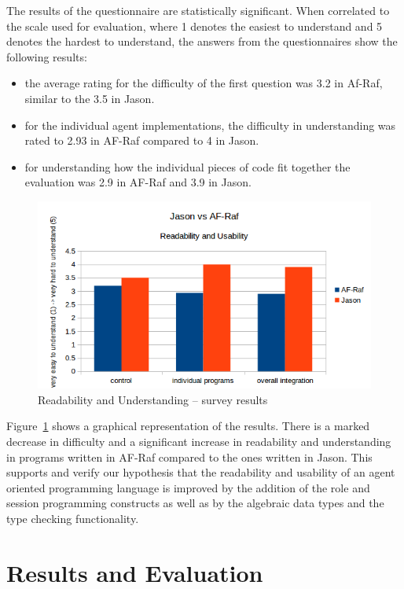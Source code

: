 \documentclass[a4paper,12pt,oneside,fleqn]{book} %
\begin{document}
{The results of the questionnaire are statistically significant. When
correlated to the scale used for evaluation, where 1 denotes the easiest to
understand and 5 denotes the hardest to understand, the answers from the
questionnaires show the following results:

\begin{itemize}
    \item the average rating for the difficulty of the first question was
      3.2 in Af-Raf, similar to the 3.5 in Jason. 
    \item for the individual agent implementations, the difficulty in
      understanding was rated to 2.93 in AF-Raf compared to 4 in Jason.
    \item for understanding how the individual pieces of code fit
      together the evaluation was 2.9 in AF-Raf and 3.9 in Jason.
\end{itemize}


\begin{figure}\footnotesize %
\includegraphics{jasonvsafraf.png}
\caption{Readability and Understanding -- survey results}
\label{fig:Survey}
\end{figure} %

Figure~\ref{fig:Survey} shows a graphical representation of the results.
There is a marked decrease in difficulty and a significant increase in
readability and understanding in programs written in AF-Raf compared to the
ones written in Jason. This supports and verify our hypothesis that the
readability and usability of an agent oriented programming language is
improved by the addition of the role and session programming constructs as
well as by the algebraic data types and the type checking functionality.

\chapter{Results and Evaluation}\label{ch:results} %

}
\end{document}

